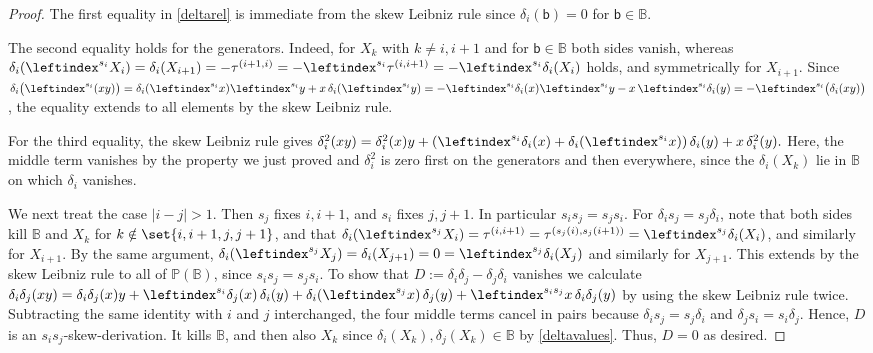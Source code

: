 \documentclass[a4paper,11pt]{amsart}
\numberwithin{equation}{subsection}
\theoremstyle{definition}
\theoremstyle{theorem}
\theoremstyle{remark}
\newcommand\bb{\mathsf{b}}
\newcommand\Po{\mathbb{P}(\mathbb{B})}
\newcommand{\Bo}{\mathbb{B}}
\begin{document}
\begin{proof}
  The first equality in \autoref{deltarel} is immediate from the skew
  Leibniz rule since $\delta_i(\bb)=0$ for $\bb\in\Bo$.

  The second equality holds for the generators. Indeed, for $X_k$ with $k\not=i,i+1$
  and for $\bb\in\Bo$ both sides vanish, whereas
  $\delta_i(\leftindex^{s_i}X_i)=\delta_i(X_{i+1})=-\tau^{(i+1,i)}
    =-\leftindex^{s_i}\tau^{(i,i+1)}=-\leftindex^{s_i}\delta_i(X_i)$
  holds, and symmetrically for $X_{i+1}$. Since $\delta_i\bigl(\leftindex^{s_i}(xy)\bigr)
      =\delta_i(\leftindex^{s_i}x)\leftindex^{s_i}y+x\,\delta_i(\leftindex^{s_i}y)
      =-\leftindex^{s_i}\delta_i(x)\leftindex^{s_i}y-x\,\leftindex^{s_i}\delta_i(y)
      =-\leftindex^{s_i}{\bigl(\delta_i(xy)\bigr)}
  $, the equality extends to all elements by the skew
  Leibniz rule.

  For the third equality, the skew Leibniz rule gives
 $ \delta_i^2(xy)=\delta_i^2(x)y
      +\left(\leftindex^{s_i}\delta_i(x)+\delta_i(\leftindex^{s_i}x)\right)\delta_i(y)
      +x\,\delta_i^2(y).
 $
  Here,  the middle term vanishes by the property we just proved and  $\delta_i^2$ is zero first on the generators and then everywhere, since
  the $\delta_i(X_k)$ lie in $\Bo$ on which  $\delta_i$ vanishes.

  We next treat the case $|i-j|>1$. Then $s_j$ fixes $i,i+1$, and
  $s_i$ fixes $j,j+1$. In particular $s_is_j=s_js_i$. For
  $\delta_is_j=s_j\delta_i$, note that both sides kill $\Bo$ and $X_k$ for
  $k\notin\set{i,i+1,j,j+1}$, and that
  $\delta_i(\leftindex^{s_j}X_i)=\tau^{(i,i+1)}=\tau^{(s_j(i),s_j(i+1))}
   =\leftindex^{s_j}{\delta_i(X_i)}$, and similarly for $X_{i+1}$. By the
   same argument,
  $\delta_i(\leftindex^{s_j}X_j)=\delta_i(X_{j+1})=0=\leftindex^{s_j}{\delta_i(X_j)}$
  and similarly for $X_{j+1}$. This extends by the skew Leibniz rule to all of $\Po$,
  since $s_is_j=s_js_i$. To show that
  $D:=\delta_i\delta_j-\delta_j\delta_i$ vanishes we calculate
  $ \delta_i\delta_j(xy)=\delta_i\delta_j(x)y
      +\leftindex^{s_i}{\delta_j(x)}\,\delta_i(y)
      +\delta_i(\leftindex^{s_j}x)\,\delta_j(y)
      +\leftindex^{s_is_j}x\,\delta_i\delta_j(y)$
   by using the skew Leibniz rule twice. Subtracting the same identity with $i$ and $j$ interchanged, the
  four middle terms cancel in pairs because  $\delta_is_j=s_j\delta_i$ and
  $\delta_js_i=s_i\delta_j$. Hence, $D$ is an $s_is_j$-skew-derivation.
  It kills $\Bo$, and then also $X_k$ since
  $\delta_i(X_k),\delta_j(X_k)\in\Bo$ by \autoref{deltavalues}. Thus,  $D=0$ as desired.


\end{proof}
\end{document}
